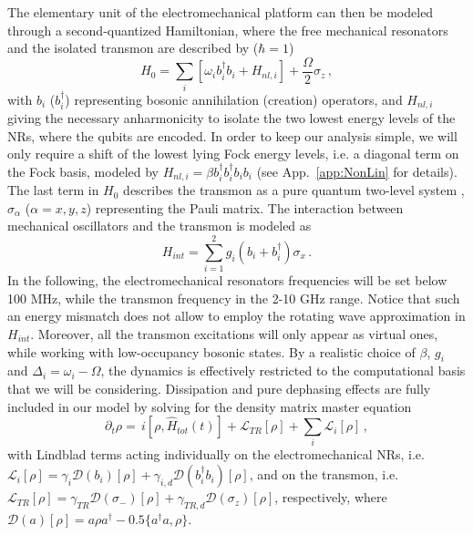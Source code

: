\documentclass[aps,twocolumn,groupedaddress,superscriptaddress,floatfix,amsmath,amssymb,prb]{revtex4-1}
\begin{document}
 The elementary unit of the electromechanical platform can then be modeled through a second-quantized Hamiltonian, where the free mechanical resonators and the isolated transmon are described by ($\hbar = 1$)
\begin{equation}
H_{0}= \sum_i \left[ \omega_i b^\dagger_i b_i + H_{nl,i} \right] + \frac{\Omega} {2}\sigma_z \, ,
\label{eq:H0}
\end{equation}
with $b_i$ ($b_i^\dagger$) representing bosonic annihilation (creation) operators, and $H_{nl,i}$ giving the necessary anharmonicity to isolate the two lowest energy levels of the NRs, where the qubits are encoded. 
In order to keep our analysis simple, we will only require a shift of the lowest lying Fock energy levels, i.e. a diagonal term on the Fock basis, modeled by $H_{nl,i} = \beta b^\dagger_i b^\dagger_i b_i b_i$  (see App.~\ref{app:NonLin} for details).
The last term in $H_{0}$ describes the transmon as a pure quantum two-level system \cite{Koch2007}, $\sigma_\alpha$ ($\alpha=x,y,z$) representing the Pauli matrix. 
The interaction between mechanical oscillators and the transmon is modeled as \cite{Sillanpaa2013,coupling}
\begin{equation}
H_{int} = \sum_{i=1}^2 g_{i} \left(b_i+b_i^\dagger\right)\sigma_x \, . %
\label{eq:Hint}
\end{equation}
In the following, the electromechanical resonators frequencies will be set below 100 MHz, while the transmon frequency in the 2-10 GHz range. Notice that such an energy mismatch does not allow to employ the rotating wave approximation in $H_{int}$. 
Moreover, all the transmon excitations will only appear as virtual ones, while working with low-occupancy bosonic states. By a realistic choice of $\beta$, $g_i$ and $\Delta_i = \omega_i - \Omega$, the dynamics is effectively restricted to the computational basis that we will be considering. Dissipation and pure dephasing effects are fully included in our model by solving for the density matrix master equation
\begin{equation}
\partial_t \rho = \, i [ {\rho}, \hat{H}_{tot}(t)] + \mathcal{L}_{TR}[\rho] + \sum_i \mathcal{L}_i [\rho] \, ,
\label{eq:mastereq}
\end{equation}
with Lindblad terms acting individually on the electromechanical NRs, i.e. 
$\mathcal{L}_i[\rho] = \gamma_{i} \mathcal{D}(b_i)[\rho] + \gamma_{i,d} \mathcal{D}(b_i^\dagger b_i)[\rho]$,
and on the transmon, i.e. 
$\mathcal{L}_{TR}[\rho] = \gamma_{TR} \mathcal{D}(\sigma_-)[\rho] + \gamma_{TR,d} \mathcal{D}(\sigma_z)[\rho]$, 
respectively, where $\mathcal{D}(a)[\rho] = a\rho a^\dagger - 0.5 \{ a^\dagger a, \rho\}$. 
\end{document}
